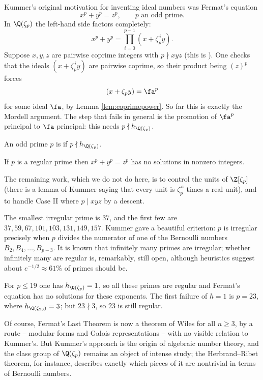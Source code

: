 Kummer's original motivation for inventing ideal numbers was Fermat's equation
$$x^p+y^p = z^p, \qquad p \text{ an odd prime}.$$
In $\Q(\zeta_p)$ the left-hand side factors completely:
$$x^p+y^p = \prod_{i=0}^{p-1}\left(x+\zeta_p^{\,i}y\right).$$
Suppose $x,y,z$ are pairwise coprime integers with $p \nmid xyz$ (this is ). One checks that the ideals $(x+\zeta_p^{\,i}y)$ are pairwise coprime, so their product being $(z)^p$ forces
$$\left(x+\zeta_py\right) = \fa^p$$
for some ideal $\fa$, by Lemma \ref{lem:coprimepower}. So far this is exactly the Mordell argument. The step that fails in general is the promotion of $\fa^p$ principal to $\fa$ principal: this needs $p \nmid h_{\Q(\zeta_p)}$.

\begin{definition}
	An odd prime $p$ is  if $p \nmid h_{\Q(\zeta_p)}$.
\end{definition}

\begin{theorem}[Kummer]
	If $p$ is a regular prime then $x^p+y^p = z^p$ has no solutions in nonzero integers.
\end{theorem}

The remaining work, which we do not do here, is to control the units of $\Z[\zeta_p]$ (there is a lemma of Kummer saying that every unit is $\zeta_p^{\,a}$ times a real unit), and to handle Case II where $p \mid xyz$ by a descent.

The smallest irregular prime is $37$, and the first few are $37, 59, 67, 101, 103, 131, 149, 157$. Kummer gave a beautiful criterion: $p$ is irregular precisely when $p$ divides the numerator of one of the Bernoulli numbers $B_2, B_4, \dots, B_{p-3}$. It is known that infinitely many primes are irregular; whether infinitely many are regular is, remarkably, still open, although heuristics suggest about $e^{-1/2} \approx 61\%$ of primes should be.

\begin{example}
	For $p \le 19$ one has $h_{\Q(\zeta_p)} = 1$, so all these primes are regular and Fermat's equation has no solutions for these exponents. The first failure of $h = 1$ is $p = 23$, where $h_{\Q(\zeta_{23})} = 3$; but $23 \nmid 3$, so $23$ is still regular.
\end{example}

\begin{remark}
	Of course, Fermat's Last Theorem is now a theorem of Wiles for all $n \geq 3$, by a route -- modular forms and Galois representations -- with no visible relation to Kummer's. But Kummer's approach is the origin of algebraic number theory, and the class group of $\Q(\zeta_p)$ remains an object of intense study; the Herbrand--Ribet theorem, for instance, describes exactly which pieces of it are nontrivial in terms of Bernoulli numbers.
\end{remark}

